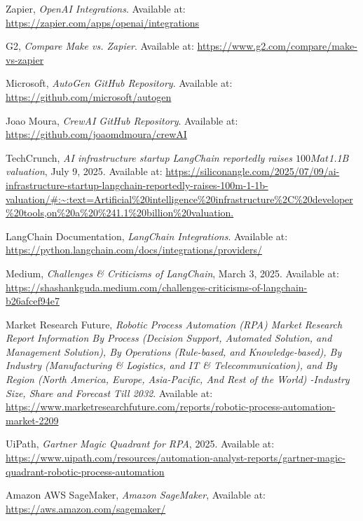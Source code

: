 \documentclass[11点, A4纸, 单面]{article}
\begin{document}
\begin{thebibliography}{99}
    Zapier, \textit{OpenAI Integrations}.
    Available at: \url{https://zapier.com/apps/openai/integrations}

    G2, \textit{Compare Make vs. Zapier}.
    Available at: \url{https://www.g2.com/compare/make-vs-zapier}

    Microsoft, \textit{AutoGen GitHub Repository}.
    Available at: \url{https://github.com/microsoft/autogen}

    Joao Moura, \textit{CrewAI GitHub Repository}.
    Available at: \url{https://github.com/joaomdmoura/crewAI}

    TechCrunch, \textit{AI infrastructure startup LangChain reportedly raises $100M at $1.1B valuation}, July 9, 2025. Available at: \url{https://siliconangle.com/2025/07/09/ai-infrastructure-startup-langchain-reportedly-raises-100m-1-1b-valuation/#:~:text=Artificial%20intelligence%20infrastructure%2C%20developer%20tools,on%20a%20%241.1%20billion%20valuation.}

    LangChain Documentation, \textit{LangChain Integrations}.
    Available at: \url{https://python.langchain.com/docs/integrations/providers/}

    Medium, \textit{Challenges \& Criticisms of LangChain}, March 3, 2025. Available at: \url{https://shashankguda.medium.com/challenges-criticisms-of-langchain-b26afcef94e7}

    Market Research Future, \textit{Robotic Process Automation (RPA) Market Research Report Information By Process (Decision Support, Automated Solution, and Management Solution), By Operations (Rule-based, and Knowledge-based), By Industry (Manufacturing \& Logistics, and IT \& Telecommunication), and By Region (North America, Europe, Asia-Pacific, And Rest of the World) -Industry Size, Share and Forecast Till 2032}.
    Available at: \url{https://www.marketresearchfuture.com/reports/robotic-process-automation-market-2209}

    UiPath, \textit{Gartner Magic Quadrant for RPA}, 2025. Available at:
    \url{https://www.uipath.com/resources/automation-analyst-reports/gartner-magic-quadrant-robotic-process-automation}

    Amazon AWS SageMaker, \textit{Amazon SageMaker}, Available at: \url{https://aws.amazon.com/sagemaker/}


\end{thebibliography}
\end{document}
